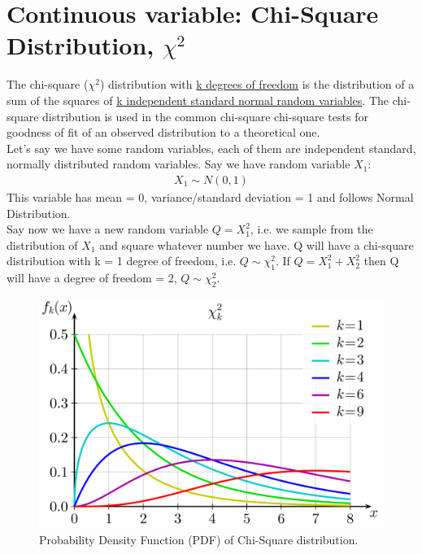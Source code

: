 \section{Continuous variable: Chi-Square Distribution, $\chi^2$}

The chi-square ($\chi^2$) distribution with \underline{k degrees of freedom} is the distribution of a sum of the squares of \underline{k independent standard normal random variables}.  The chi-square distribution is used in the common chi-square chi-square tests for goodness of fit of an observed distribution to a theoretical one. \\

Let's say we have some random variables, each of them are independent standard, normally distributed random variables. Say we have random variable $X_1$:
\begin{eqnarray}
X_1 \sim N(0, 1)
\end{eqnarray}
This variable has mean = 0, variance/standard deviation = 1 and follows Normal Distribution.  \\

Say now we have a new random variable $Q = X_1^2$, i.e. we sample from the distribution of $X_1$ and square whatever number we have. Q will have a chi-square distribution with k = 1 degree of freedom, i.e. $Q \sim \chi^2_1$. If $Q = X_1^2 + X_2^2$ then Q will have a degree of freedom = 2, $Q \sim \chi^2_2$.

\begin{figure}[h!]
\begin{center}
	\includegraphics[scale=0.07]{cs_pdf.png}
	\caption[]{Probability Density Function (PDF) of Chi-Square distribution.}
	\label{cspdf}
	\end{center}
	\end{figure}

